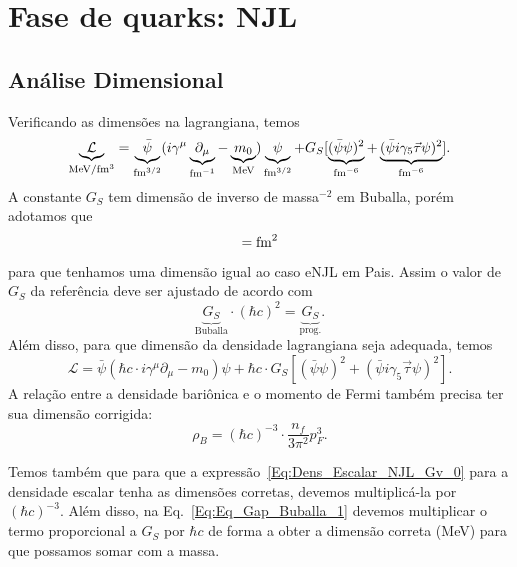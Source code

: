 \section{Fase de quarks: NJL}

\subsection{Análise Dimensional}

Verificando as dimensões na lagrangiana, temos
\begin{equation}
	\underbrace{\mathcal{L}}_{\mathcal{\rm{MeV}/\rm{fm}^3}} = \underbrace{\bar{\psi}}_{\rm{fm}^{3/2}}(i\gamma^\mu\underbrace{\partial_\mu}_{\rm{fm}^{-1}} - \underbrace{m_0}_{\rm{MeV}})\underbrace{\psi}_{\rm{fm}^{3/2}} + G_S [ \underbrace{(\bar{\psi}\psi)^2}_{\rm{fm}^{-6}} + \underbrace{(\bar{\psi}i\gamma_5\vec{\tau}\psi)^2}_{\rm{fm}^{-6}}].
\end{equation}
%
A constante $G_S$ tem dimensão de inverso de massa$^{-2}$ em Buballa\cite{Buballa1996}, porém adotamos que 
\begin{equation}
	[G_S] = \rm{fm}^{2}
\end{equation}
%
para que tenhamos uma dimensão igual ao caso eNJL em Pais\cite{Pais}. Assim o valor de $G_S$ da referência deve ser ajustado de acordo com
\begin{equation}
	\underbrace{G_S}_{\textrm{Buballa}} \cdot (\hbar c)^2 = \underbrace{G_S}_{\textrm{prog.}}.
\end{equation}
%
Além disso, para que dimensão da densidade lagrangiana seja adequada, temos
\begin{equation}
	\mathcal{L} = \bar{\psi}(\hbar c \cdot i\gamma^\mu\partial_\mu - m_0)\psi + \hbar c \cdot G_S[(\bar{\psi}\psi)^2 + (\bar{\psi}i\gamma_5\vec{\tau}\psi)^2].
\end{equation}
%
A relação entre a densidade bariônica e o momento de Fermi também precisa ter sua dimensão corrigida:
\begin{equation}
	\rho_B = (\hbar c)^{-3} \cdot \frac{n_f}{3\pi^2}p_F^3.
\end{equation}

Temos também que para que a expressão~\eqref{Eq:Dens_Escalar_NJL_Gv_0} para a densidade escalar tenha as dimensões corretas, devemos multiplicá-la por $(\hbar c)^{-3}$. Além disso, na Eq.~\eqref{Eq:Eq_Gap_Buballa_1} devemos multiplicar o termo proporcional a $G_S$ por $\hbar c$ de forma a obter a dimensão correta (MeV) para que possamos somar com a massa.

